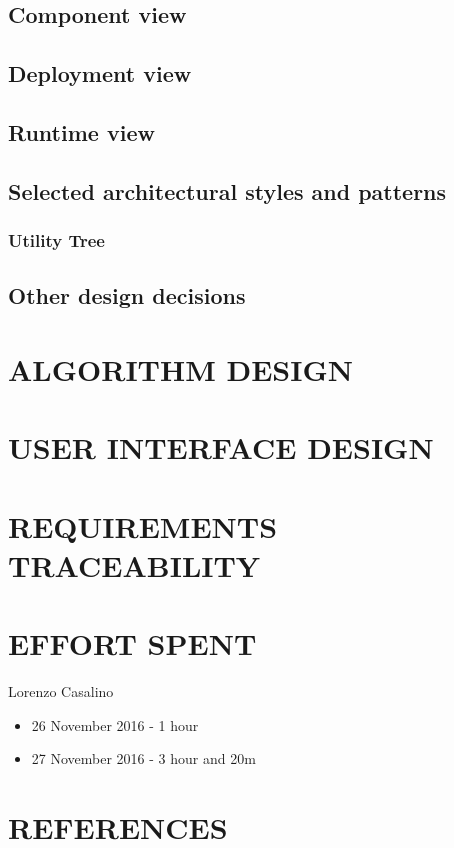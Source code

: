 \documentclass{article}
\begin{document}
		\subsection{Component view}

		\subsection{Deployment view}

		\subsection{Runtime view}

		\subsection{Selected architectural styles and patterns}

			\subsubsection{Utility Tree}

		\subsection{Other design decisions}


	\section{ALGORITHM DESIGN}

	\section{USER INTERFACE DESIGN}

	\section{REQUIREMENTS TRACEABILITY}

	\section{EFFORT SPENT}

	Lorenzo Casalino

		\begin{itemize}
			\item 26 November 2016 - 1 hour
			\item 27 November 2016 - 3 hour and 20m
		\end{itemize}

	\section{REFERENCES}
\end{document}
